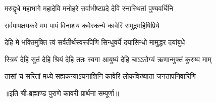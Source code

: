 

\twolineshloka
{मरुद्वृधे महाभागे महादेवि मनोहरे}
{सर्वाभीष्टप्रदे देवि स्नास्थितां पुण्यवर्धिनि}%

\twolineshloka
{सर्वपापक्षयकरे मम पापं विनाशय}
{कवेरकन्ये कावेरि समुद्रमहिषिप्रिये}%

\twolineshloka
{देहि मे भक्तिमुक्ति त्वं सर्वतीर्थस्वरूपिणि}
{सिन्धुवर्ये दयासिन्धो मामुद्धर दयांबुधे}%

\twolineshloka
{स्त्रियं देहि सुतं देहि श्रियं देहि ततः स्वगा}
{आयुष्यं देहि चाऽऽरोग्यं ऋणान्मुक्तं कुरुष्व माम्}%

\twolineshloka
{तासां च सरितां मध्ये सह्यकन्याऽघनाशिनि}
{कावेरि लोकविख्याता जनतापनिवारिणि}%

॥इति श्री-ब्रह्माण्ड पुराणे कावरी प्रार्थना सम्पूर्णा॥